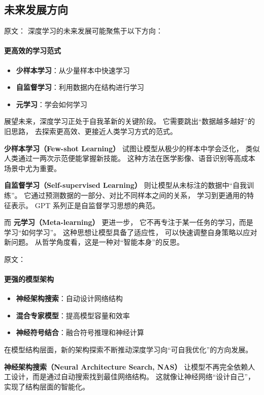 \subsection{未来发展方向}

原文：
深度学习的未来发展可能聚焦于以下方向：
\paragraph{更高效的学习范式}
\begin{itemize}
\item {\bf 少样本学习}：从少量样本中快速学习
\item {\bf 自监督学习}：利用数据内在结构进行学习
\item {\bf 元学习}：学会如何学习
\end{itemize}
展望未来，深度学习正处于自我革新的关键阶段。  
它需要跳出“数据越多越好”的旧思路，  
去探索更高效、更接近人类学习方式的范式。  

{\bf 少样本学习（Few-shot Learning）} 试图让模型从极少的样本中学会泛化，  
类似人类通过一两次示范便能掌握新技能。  
这种方法在医学影像、语音识别等高成本场景中尤为重要。  

{\bf 自监督学习（Self-supervised Learning）} 则让模型从未标注的数据中“自我训练”。  
它通过预测数据的一部分、对比不同样本之间的关系，  
学习到更通用的特征表示。  
GPT 系列正是自监督学习思想的典范。  

而 {\bf 元学习（Meta-learning）} 更进一步，  
它不再专注于某一任务的学习，而是学习“如何学习”。  
这种思想让模型具备了适应性，  
可以快速调整自身策略以应对新问题。  
从哲学角度看，这是一种对“智能本身”的反思。


原文：
\paragraph{更强的模型架构}
\begin{itemize}
\item {\bf 神经架构搜索}：自动设计网络结构
\item {\bf 混合专家模型}：提高模型容量和效率
\item {\bf 神经符号结合}：融合符号推理和神经计算
\end{itemize}
在模型结构层面，新的架构探索不断推动深度学习向“可自我优化”的方向发展。  

{\bf 神经架构搜索（Neural Architecture Search, NAS）}  
让模型不再完全依赖人工设计，而是通过自动搜索找到最佳网络结构。  
这就像让神经网络“设计自己”，实现了结构层面的智能化。  

